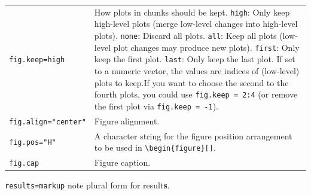 \documentclass[
]{book}
\begin{document}
\begin{longtable}[]{@{}
  >{\raggedright\arraybackslash}p{}
  >{\raggedright\arraybackslash}p{}@{}}
\texttt{fig.keep=\textquotesingle{}high\textquotesingle{}} & How plots in chunks should be kept. \texttt{high}: Only keep high-level plots (merge low-level changes into high-level plots). \texttt{none}: Discard all plots. \texttt{all}: Keep all plots (low-level plot changes may produce new plots). \texttt{first}: Only keep the first plot. \texttt{last}: Only keep the last plot. If set to a numeric vector, the values are indices of (low-level) plots to keep.If you want to choose the second to the fourth plots, you could use \texttt{fig.keep\ =\ 2:4} (or remove the first plot via \texttt{fig.keep\ =\ -1}). \\
\texttt{fig.align="center"} & Figure alignment. \\
\texttt{fig.pos="H"} & A character string for the figure position arrangement to be used in \texttt{\textbackslash{}begin\{figure\}{[}{]}}. \\
\texttt{fig.cap} & Figure caption. \\
\end{longtable}

{\texttt{results=\textquotesingle{}markup\textquotesingle{}}} note plural form for result\textbf{s}.
\end{document}
